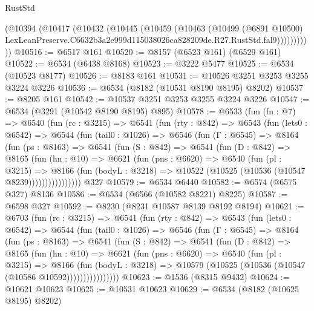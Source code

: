 \begin{lexlean}{RustStd}
\begin{coremodule}
            (@10394
              (@10417
                (@10432
                  (@10445
                    (@10459
                      (@10463
                        (@10499
                          (@6891 @10500)
                          LexLeanPreserve.C6632b3a2e999d115038026ca828209de.R27.RustStd.fal9)))))))))))
@10516 := @6517 @161
@10520 := @8157 (@6523 @161) (@6529 @161)
@10522 := @6534 (@6438 @8168)
@10523 := @3222 @5477
@10525 := @6534 (@10523 @8177)
@10526 := @8183 @161
@10531 := @10526 @3251 @3253 @3255 @3224 @3226
@10536 := @6534 (@8182 (@10531 @8190 @8195) @8202)
@10537 := @8205 @161
@10542 := @10537 @3251 @3253 @3255 @3224 @3226
@10547 := @6534 (@3291 (@10542 @8190 @8195) @895)
@10578 := @6533
    (fun (fn : @7) =>
    @6540
      (fun (rc : @3215) =>
      @6541
        (fun (rty : @842) =>
        @6543
          (fun (lets0 : @6542) =>
          @6544
            (fun (tail0 : @1026) =>
            @6546
              (fun (Γ : @6545) =>
              @8164
                (fun (ps : @8163) =>
                @6541
                  (fun (S : @842) =>
                  @6541
                    (fun (D : @842) =>
                    @8165
                      (fun (hn : @10) =>
                      @6621
                        (fun (pns : @6620) =>
                        @6540
                          (fun (pl : @3215) =>
                          @8166
                            (fun (bodyL : @3218) =>
                            @10522 (@10525 (@10536 (@10547 @8239))))))))))))))))
    @327
@10579 := @6534 @6440
@10582 := @6574 (@6575 @327) @8136
@10586 := @6534 (@6566 (@10582 @8221) @8225)
@10587 := @6598 @327
@10592 := @8230 (@8231 @10587 @8139 @8192 @8194)
@10621 := @6703
    (fun (rc : @3215) =>
    @6541
      (fun (rty : @842) =>
      @6543
        (fun (lets0 : @6542) =>
        @6544
          (fun (tail0 : @1026) =>
          @6546
            (fun (Γ : @6545) =>
            @8164
              (fun (ps : @8163) =>
              @6541
                (fun (S : @842) =>
                @6541
                  (fun (D : @842) =>
                  @8165
                    (fun (hn : @10) =>
                    @6621
                      (fun (pns : @6620) =>
                      @6540
                        (fun (pl : @3215) =>
                        @8166
                          (fun (bodyL : @3218) =>
                          @10579 (@10525 (@10536 (@10547 (@10586 @10592))))))))))))))))
@10623 := @1536 (@8315 @9432)
@10624 := @10621 @10623
@10625 := @10531 @10623
@10629 := @6534 (@8182 (@10625 @8195) @8202)

\end{coremodule}
\end{lexlean}
